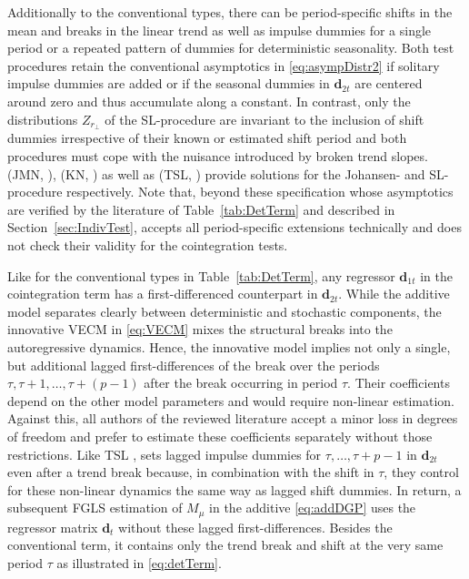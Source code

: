 Additionally to the conventional types, there can be period-specific shifts in the mean and breaks in the linear trend as well as impulse dummies for a single period or a repeated pattern of dummies for deterministic seasonality. Both test procedures retain the conventional asymptotics in \eqref{eq:asympDistr2} if solitary impulse dummies are added or if the seasonal dummies in $ \boldsymbol{d}_{2t} $ are centered around zero and thus accumulate along a constant. In contrast, only the distributions $ Z_{r_\perp} $ of the SL-procedure are invariant to the inclusion of shift dummies irrespective of their known or estimated shift period and both procedures must cope with the nuisance introduced by broken trend slopes. \citeauthor*{JohansenEtAl2000} (JMN, \citeyear{JohansenEtAl2000}), \citeauthor*{KuritaNielsen2019} (KN, \citeyear{KuritaNielsen2019}) as well as \citeauthor*{TrenklerEtAl2008} (TSL, \citeyear{TrenklerEtAl2008}) provide solutions for the Johansen- and SL-procedure respectively. Note that, beyond these specification whose asymptotics are verified by the literature of Table~\ref{tab:DetTerm} and described in Section~\ref{sec:IndivTest},  accepts all period-specific extensions technically and does not check their validity for the cointegration tests.

Like for the conventional types in Table~\ref{tab:DetTerm}, any regressor $ \boldsymbol{d}_{1t} $ in the cointegration term has a first-differenced counterpart in $ \boldsymbol{d}_{2t} $. While the additive model separates clearly between deterministic and stochastic components, the innovative VECM in \eqref{eq:VECM} mixes the structural breaks into the autoregressive dynamics. Hence, the innovative model implies not only a single, but additional lagged first-differences of the break over the periods $ \tau, \tau+1, \ldots, \tau+(p-1) $ after the break occurring in period $ \tau $. Their coefficients depend on the other model parameters and would require non-linear estimation. Against this, all authors of the reviewed literature accept a minor loss in degrees of freedom and prefer to estimate these coefficients separately without those restrictions. Like TSL \citeyearpar[p.~335]{TrenklerEtAl2008},  sets lagged impulse dummies for $ \tau, \ldots, \tau+p-1 $ in $ \boldsymbol{d}_{2t} $ even after a trend break because, in combination with the shift in $ \tau $, they control for these non-linear dynamics the same way as lagged shift dummies. In return, a subsequent FGLS estimation of $ M_\mu $ in the additive \eqref{eq:addDGP} uses the regressor matrix $ \boldsymbol{d}_t $ without these lagged first-differences. Besides the conventional term, it contains only the trend break and shift at the very same period $ \tau $ as illustrated in \eqref{eq:detTerm}.


